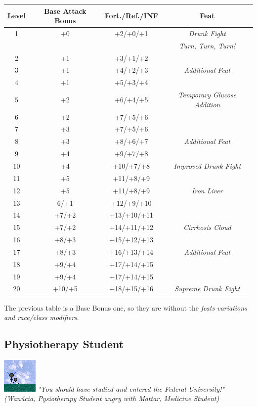 \documentclass[ letterpaper,12pt]{article}
\begin{document}
\begin{center} \begin{tabular}{|c||c|c|c|}
\hline
{\bf Level}&{\bf Base Attack Bonus}&{\bf Fort./Ref./INF}&{\bf Feat}\\
\hline
1&+0&+2/+0/+1&{\it Drunk Fight}\\
&&&{\it Turn, Turn, Turn!} \\
\hline
2&+1&+3/+1/+2&\\
\hline
3&+1&+4/+2/+3&{\it Additional Feat}\\
\hline
4&+1&+5/+3/+4&\\
\hline
5&+2&+6/+4/+5&{\it Temporary Glucose Addition}\\
\hline
6&+2&+7/+5/+6&\\
\hline
7&+3&+7/+5/+6&\\
\hline
8&+3&+8/+6/+7&{\it Additional Feat}\\
\hline
9&+4&+9/+7/+8&\\
\hline
10&+4&+10/+7/+8&{\it Improved Drunk Fight}\\
\hline
11&+5&+11/+8/+9&\\
\hline
12&+5&+11/+8/+9&{\it Iron Liver}\\
\hline
13&6/+1&+12/+9/+10&\\
\hline
14&+7/+2&+13/+10/+11&\\
\hline
15&+7/+2&+14/+11/+12&{\it Cirrhosis Cloud}\\
\hline
16&+8/+3&+15/+12/+13&\\
\hline
17&+8/+3&+16/+13/+14&{\it Additional Feat}\\
\hline
18&+9/+4&+17/+14/+15&\\
\hline
19&+9/+4&+17/+14/+15&\\
\hline
20&+10/+5&+18/+15/+16&{\it Supreme Drunk Fight}\\
\hline
\end{tabular} \end{center}

The previous table is a Base Bonus one, so they are without the {\it feats variations and race/class modifiers}.\\

\subsection{Physiotherapy Student}
\includegraphics{../data/classes/Img/fisioterapia.png}
{\it "You should have studied and entered the Federal University!"\\
     (Wanúcia, Pysiotherapy Student angry with Mattar, Medicine Student)}\\
\end{document}
